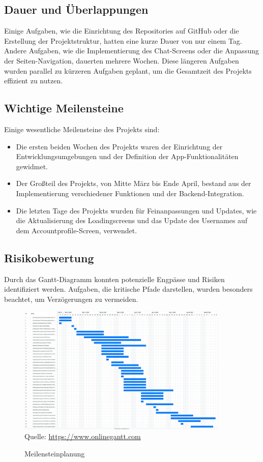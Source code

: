 \subsection*{Dauer und Überlappungen}
Einige Aufgaben, wie die Einrichtung des Repositories auf GitHub oder die Erstellung der Projektstruktur, hatten eine kurze Dauer von nur einem Tag.
Andere Aufgaben, wie die Implementierung des Chat-Screens oder die Anpassung der Seiten-Navigation, dauerten mehrere Wochen. \newline
Diese längeren Aufgaben wurden parallel zu kürzeren Aufgaben geplant, um die Gesamtzeit des Projekts effizient zu nutzen.

\subsection*{Wichtige Meilensteine}
Einige wesentliche Meilensteine des Projekts sind:
\begin{itemize}
    \item Die ersten beiden Wochen des Projekts waren der Einrichtung der Entwicklungsumgebungen und der Definition der App-Funktionalitäten gewidmet.
    \item Der Großteil des Projekts, von Mitte März bis Ende April, bestand aus der Implementierung verschiedener Funktionen und der Backend-Integration.
    \item Die letzten Tage des Projekts wurden für Feinanpassungen und Updates, wie die Aktualisierung des Loadingscreens und das Update des Usernames auf dem Accountprofile-Screen, verwendet.
\end{itemize}

\subsection*{Risikobewertung}
Durch das Gantt-Diagramm konnten potenzielle Engpässe und Risiken identifiziert werden. \newline
Aufgaben, die kritische Pfade darstellen, wurden besonders beachtet, um Verzögerungen zu vermeiden.

\begin{figure}[H]
    \caption[Meilensteinplanung]{Meilensteinplanung}
    \includegraphics[width=0.9\textwidth]{assets/figures/STH GANTT Diagramm.png}
    \\
    Quelle: \url{https://www.onlinegantt.com}
\end{figure}
